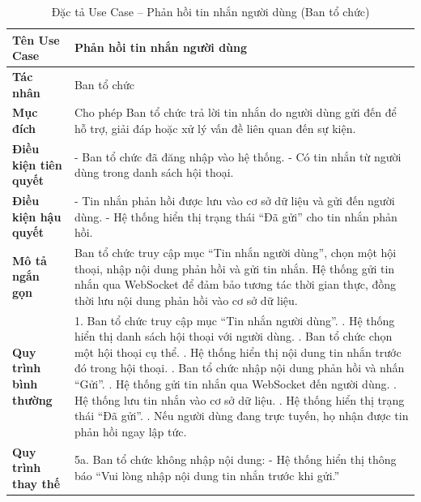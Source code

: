 \renewcommand{\arraystretch}{1.3}
\setlength{\tabcolsep}{8pt}
\begin{longtable}{|p{}|p{}|}
\caption{Đặc tả Use Case -- Phản hồi tin nhắn người dùng (Ban tổ chức) }
\label{tab:uc_reply_message} \\
\hline
\textbf{Tên Use Case} & Phản hồi tin nhắn người dùng \\ \hline
\textbf{Tác nhân} & Ban tổ chức \\ \hline
\textbf{Mục đích} & Cho phép Ban tổ chức trả lời tin nhắn do người dùng gửi đến để hỗ trợ, giải đáp hoặc xử lý vấn đề liên quan đến sự kiện. \\ \hline
\textbf{Điều kiện tiên quyết} & 
- Ban tổ chức đã đăng nhập vào hệ thống. \newline
- Có tin nhắn từ người dùng trong danh sách hội thoại. \\ \hline
\textbf{Điều kiện hậu quyết} & 
- Tin nhắn phản hồi được lưu vào cơ sở dữ liệu và gửi đến người dùng. \newline
- Hệ thống hiển thị trạng thái “Đã gửi” cho tin nhắn phản hồi. \\ \hline
\textbf{Mô tả ngắn gọn} & 
Ban tổ chức truy cập mục “Tin nhắn người dùng”, chọn một hội thoại, nhập nội dung phản hồi và gửi tin nhắn. Hệ thống gửi tin nhắn qua WebSocket để đảm bảo tương tác thời gian thực, đồng thời lưu nội dung phản hồi vào cơ sở dữ liệu. \\ \hline
\textbf{Quy trình bình thường} &
1. Ban tổ chức truy cập mục “Tin nhắn người dùng”. \newline
2. Hệ thống hiển thị danh sách hội thoại với người dùng. \newline
3. Ban tổ chức chọn một hội thoại cụ thể. \newline
4. Hệ thống hiển thị nội dung tin nhắn trước đó trong hội thoại. \newline
5. Ban tổ chức nhập nội dung phản hồi và nhấn “Gửi”. \newline
6. Hệ thống gửi tin nhắn qua WebSocket đến người dùng. \newline
7. Hệ thống lưu tin nhắn vào cơ sở dữ liệu. \newline
8. Hệ thống hiển thị trạng thái “Đã gửi”. \newline
9. Nếu người dùng đang trực tuyến, họ nhận được tin phản hồi ngay lập tức. \\ \hline
\textbf{Quy trình thay thế} &
5a. Ban tổ chức không nhập nội dung: \newline
\hspace*{1em}- Hệ thống hiển thị thông báo “Vui lòng nhập nội dung tin nhắn trước khi gửi.” \newline

\end{longtable}
